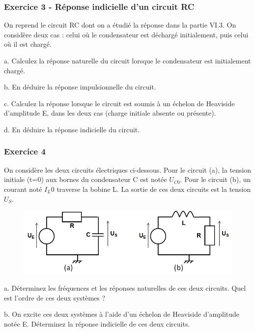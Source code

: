 \documentclass[11pt]{report}
\begin{document}
 	\subsubsection{Exercice 3 - Réponse indicielle d'un circuit RC}
 	
 	On reprend le circuit RC dont on a étudié la réponse dans la partie VI.3. On considère deux cas : celui où le condensateur est déchargé initialement, puis celui où il est chargé. 
 	
 	a. Calculez la réponse naturelle du circuit lorsque le condensateur est initialement chargé.
 	
 	b. En déduire la réponse impulsionnelle du circuit.
 	
 	c. Calculez la réponse lorsque le circuit est soumis à un échelon de Heaviside d'amplitude E, dans les deux cas (charge initiale absente ou présente).
 	
 	d. En déduire la réponse indicielle du circuit.
 	 
 	\vspace{1\baselineskip}
 	
 	\subsubsection{Exercice 4}
 	
 	On considère les deux circuits électriques ci-dessous. Pour le circuit (a), la tension initiale (t=0) aux bornes du condensateur C est notée $U_{C0}$. Pour le circuit (b), un courant noté $I_L0$ traverse la bobine L. La sortie de ces deux circuits est la tension $U_{S}$.
 	
 	\begin{figure}[h!]
 		\centering
 		\includegraphics[scale=0.5]{images/Exo_2_4.jpg} 
 	\end{figure} 
 	
 	a. Déterminez les fréquences et les réponses naturelles de ces deux circuits. Quel est l'ordre de ces deux systèmes ? 
 	
 	b. On excite ces deux systèmes à l'aide d'un échelon de Heaviside d'amplitude notée E. Déterminez la réponse indicielle de ces deux circuits. 
 	
\end{document}
